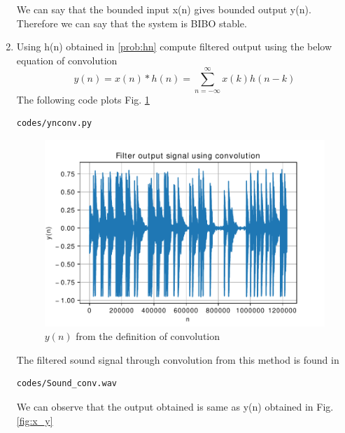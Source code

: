\documentclass[journal,12pt,twocolumn]{IEEEtran}
\renewcommand\thesection{\arabic{section}}
\begin{document}
\begin{enumerate}[label=\thesection.\arabic*,ref=\thesection.\theenumi]
We can say that the bounded input x(n) gives bounded output
y(n). Therefore we can say that the system is BIBO stable.

\item Using h(n) obtained in \ref{prob:hn} compute filtered output using the below equation of convolution
%
\begin{equation} 
\label{eq:convolution}
y(n) = x(n)*h(n) = \sum_{n=-\infty}^{\infty}x(k)h(n-k)
\end{equation}
\solution The following code plots Fig. \ref{fig:ynconv}
%
\begin{lstlisting}
codes/ynconv.py
\end{lstlisting}
\begin{figure}[!ht]
\centering
\includegraphics[width=\columnwidth]{./figs/ynconv}
\caption{$y(n)$ from the definition of convolution}
\label{fig:ynconv}
\end{figure}
The filtered sound signal through convolution from this method is found in
\begin{lstlisting}
codes/Sound_conv.wav
\end{lstlisting}
We can observe that the output obtained is same as y(n) obtained in Fig. \ref{fig:x_y}

\end{enumerate}
\end{document}
